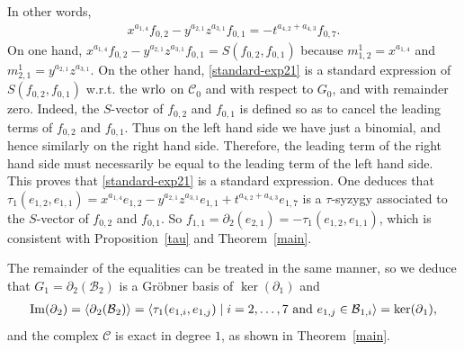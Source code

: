 \documentclass[ALCO]{cedram}
\newcommand{\mcb}{\mbox{$\mathcal{B}$}}
\newcommand{\mcc}{\mbox{$\mathcal{C}$}}
\newcommand{\dif}{\mbox{$\partial$}}
\newcommand{\wrlo}{\mbox{${\rm wrlo}$}}
\begin{document}
In other words, 
\begin{eqnarray}\label{standard-exp21}
x^{a_{1,4}}f_{0,2}-y^{a_{2,1}}z^{a_{3,1}}f_{0,1}=-t^{a_{4,2}+a_{4,3}}f_{0,7}.
\end{eqnarray}
On one hand,
$x^{a_{1,4}}f_{0,2}-y^{a_{2,1}}z^{a_{3,1}}f_{0,1}=S(f_{0,2},f_{0,1})$
because $m^1_{1,2}=x^{a_{1,4}}$ and
$m^1_{2,1}=y^{a_{2,1}}z^{a_{3,1}}$. On the other hand,
\eqref{standard-exp21} is a standard expression of
$S(f_{0,2},f_{0,1})$ w.r.t. the $\wrlo$ on $\mcc_0$ and with respect
to $G_0$, and with remainder zero. Indeed, the $S$-vector of $f_{0,2}$
and $f_{0,1}$ is defined so as to cancel the leading terms of
$f_{0,2}$ and $f_{0,1}$. Thus on the left hand side we have just a
binomial, and hence similarly on the right hand side. Therefore, the
leading term of the right hand side must necessarily be equal to the
leading term of the left hand side. This proves that
\eqref{standard-exp21} is a standard expression. One deduces that
$\tau_1(e_{1,2},e_{1,1})=x^{a_{1,4}}e_{1,2}-
y^{a_{2,1}}z^{a_{3,1}}e_{1,1}+t^{a_{4,2}+a_{4,3}}e_{1,7}$ is a
$\tau$-syzygy associated to the $S$-vector of $f_{0,2}$ and $f_{0,1}$.
So $f_{1,1}=\dif_2(e_{2,1})=-\tau_1(e_{1,2},e_{1,1})$, which is
consistent with Proposition~\ref{tau} and Theorem~\ref{main}.

The remainder of the equalities can be treated in the same manner, so
we deduce that $G_1=\dif_2(\mcb_2)$ is a Gr\"obner basis of
$\ker(\dif_1)$ and
\begin{eqnarray*}
{\rm Im}(\dif_2)=\langle\dif_{2}(\mcb_{2})\rangle=\langle
\tau_1(e_{1,i},e_{1,j})\mid i=2,\ldots ,7\mbox{ and
  }e_{1,j}\in\mcb_{1,i} \rangle=\ker(\dif_{1}),
\end{eqnarray*}
and the complex $\mcc$ is exact in degree $1$, as shown in
Theorem~\ref{main}.
\end{document}
